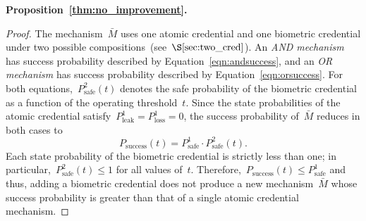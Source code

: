 \documentclass[conference,compsoc]{IEEEtran}
\begin{document}
\medskip
\noindent
\textbf{Proposition~\ref{thm:no_improvement}.}
\begin{proof}
    The mechanism~$\bar{M}$ uses one atomic credential and one biometric credential under two possible compositions~(see~$\S\ref{sec:two_cred}$). An \emph{AND mechanism} has success probability described by Equation~\ref{eqn:andsuccess}, and an \emph{OR mechanism} has success probability described by Equation~\ref{eqn:orsuccess}. For both equations,~$P^2_{\text{safe}}(t)$ denotes the safe probability of the biometric credential as a function of the operating threshold~$t$. Since the state probabilities of the atomic credential satisfy~$P^1_\text{leak} =  P^1_\text{loss} = 0$, the success probability of~$\bar{M}$ reduces in both cases to
    \begin{equation*}
        P_{\text{success}}(t) = P^1_\text{safe} \cdot P^2_{\text{safe}}(t).
    \end{equation*}
    Each state probability of the biometric credential is strictly less than one; in particular,~$P^2_{\text{safe}}(t) \le 1$ for all values of~$t$. Therefore,~$P_{\text{success}}(t) \le P^1_\text{safe}$ and thus, adding a biometric credential does not produce a new mechanism~$\bar{M}$ whose success probability is greater than that of a single atomic credential mechanism.
\end{proof}
\end{document}
